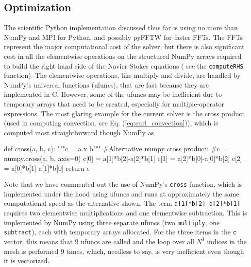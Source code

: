 \documentclass[final,3p,times,twocolumn]{elsarticle}
\newcommand{\inpyth}{\lstinline[style=inlinestyle]} %[]%
\begin{document}
\subsection{Optimization}
\label{sec:optimization}
The scientific Python implementation discussed thus far is using no more than 
NumPy and MPI for Python, and possibly pyFFTW for faster FFTs. The FFTs 
represent the major computational cost of the solver, but there is also 
significant cost in all the elementwise operations on the structured NumPy 
arrays required to build the right hand side of the Navier-Stokes equations (
see the \inpyth{computeRHS} function). The elementwise operations, like 
multiply 
and divide, are handled by NumPy's universal functions (ufuncs), that are fast 
because they are implemented in C. However, some of the ufuncs may be 
inefficient due to temporary arrays that need to be created, especially for 
multiple-operator expressions. The most glaring example for the current solver 
is the cross product (used in computing convection, see Eq. 
(\ref{eq:curl_convection})), which is computed most straightforward though 
NumPy as
\begin{python}
def cross(a, b, c):
    """c = a x b"""
    #Alternative numpy cross product:
    #c = numpy.cross(a, b, axis=0)
    c[0] = a[1]*b[2]-a[2]*b[1]
    c[1] = a[2]*b[0]-a[0]*b[2]
    c[2] = a[0]*b[1]-a[1]*b[0]
    return c
\end{python}
Note that we have commented out the use of NumPy's \inpyth{cross} function, 
which is implemented under the hood using ufuncs and runs at approximately the 
same computational speed as the alternative shown. The term 
\inpyth{a[1]*b[2]-a[2]*b[1]} requires two elementwise multiplications and one 
elementwise subtraction. This is implemented by NumPy using three separate 
ufuncs (two \inpyth{multiply}, one \inpyth{subtract}), each with temporary 
arrays allocated. For the three items in the \inpyth{c} vector, this means that 
9 ufuncs are called and the loop over all $N^3$ indices in the mesh is 
performed 9 times, which, needless to say, is very inefficient even though it 
is vectorized.
\end{document}
